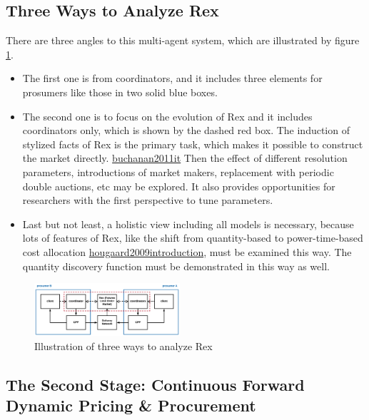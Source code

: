 \documentclass[letterpaper,8pt,twocolumn,twoside,]{pinp}
\providecommand{\tightlist}{%
  \setlength{\itemsep}{0pt}\setlength{\parskip}{0pt}}
\begin{document}
\hypertarget{three-ways-to-analyze-rex}{%
\subsection{Three Ways to Analyze Rex}\label{three-ways-to-analyze-rex}}

There are three angles to this multi-agent system, which are illustrated
by figure \ref{2}.

\begin{itemize}
\tightlist
\item
  The first one is from coordinators, and it includes three elements for
  prosumers like those in two solid blue boxes.
\item
  The second one is to focus on the evolution of Rex and it includes
  coordinators only, which is shown by the dashed red box. The induction
  of stylized facts of Rex is the primary task, which makes it possible
  to construct the market directly.
  \protect\hyperlink{reference}{buchanan2011it} Then the effect of
  different resolution parameters, introductions of market makers,
  replacement with periodic double auctions, etc may be explored. It
  also provides opportunities for researchers with the first perspective
  to tune parameters.
\item
  Last but not least, a holistic view including all models is necessary,
  because lots of features of Rex, like the shift from quantity-based to
  power-time-based cost allocation
  \protect\hyperlink{reference}{hougaard2009introduction}, must be
  examined this way. The quantity discovery function must be
  demonstrated in this way as well.
\end{itemize}

\begin{figure}
\begin{center}
  \includegraphics[width=0.48\textwidth]{../../../images/4-10.png} 
\end{center}
\caption{Illustration of three ways to analyze Rex}
\label{2}
\end{figure}

\hypertarget{the-second-stage-continuous-forward-dynamic-pricing-procurement}{%
\subsection{The Second Stage: Continuous Forward Dynamic Pricing \&
Procurement}\label{the-second-stage-continuous-forward-dynamic-pricing-procurement}}
\end{document}

